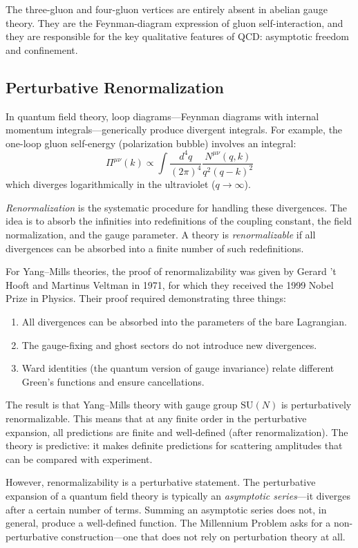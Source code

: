 The three-gluon and four-gluon vertices are entirely absent in abelian gauge theory. They are the Feynman-diagram expression of gluon self-interaction, and they are responsible for the key qualitative features of QCD: asymptotic freedom and confinement.

\subsection{Perturbative Renormalization}

In quantum field theory, loop diagrams---Feynman diagrams with internal momentum integrals---generically produce divergent integrals. For example, the one-loop gluon self-energy (polarization bubble) involves an integral:
\[
\Pi^{\mu\nu}(k) \propto \int \frac{d^4q}{(2\pi)^4} \frac{N^{\mu\nu}(q, k)}{q^2(q-k)^2}
\]
which diverges logarithmically in the ultraviolet ($q \to \infty$).

\textit{Renormalization} is the systematic procedure for handling these divergences. The idea is to absorb the infinities into redefinitions of the coupling constant, the field normalization, and the gauge parameter. A theory is \textit{renormalizable} if all divergences can be absorbed into a finite number of such redefinitions.

For Yang--Mills theories, the proof of renormalizability was given by Gerard 't Hooft and Martinus Veltman in 1971, for which they received the 1999 Nobel Prize in Physics. Their proof required demonstrating three things:
\begin{enumerate}
  \item All divergences can be absorbed into the parameters of the bare Lagrangian.
  \item The gauge-fixing and ghost sectors do not introduce new divergences.
  \item Ward identities (the quantum version of gauge invariance) relate different Green's functions and ensure cancellations.
\end{enumerate}

The result is that Yang--Mills theory with gauge group $\mathrm{SU}(N)$ is perturbatively renormalizable. This means that at any finite order in the perturbative expansion, all predictions are finite and well-defined (after renormalization). The theory is predictive: it makes definite predictions for scattering amplitudes that can be compared with experiment.

However, renormalizability is a perturbative statement. The perturbative expansion of a quantum field theory is typically an \textit{asymptotic series}---it diverges after a certain number of terms. Summing an asymptotic series does not, in general, produce a well-defined function. The Millennium Problem asks for a non-perturbative construction---one that does not rely on perturbation theory at all.

